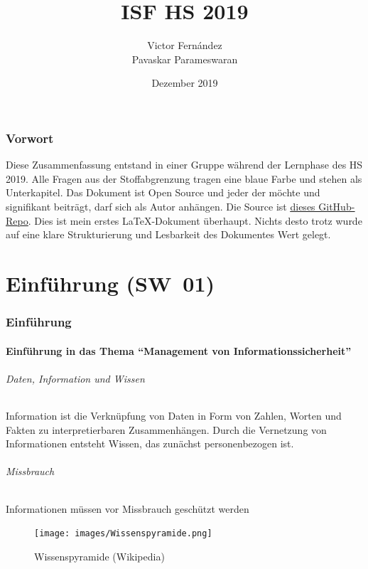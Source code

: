 \documentclass[10pt,a4paper]{article}
\title{ISF HS 2019}
\author{Victor Fernández\\Pavaskar Parameswaran}
\date{Dezember 2019}
\begin{document}
\maketitle
\thispagestyle{empty}
\section*{Vorwort}Diese Zusammenfassung entstand in einer Gruppe während der Lernphase des HS 2019. Alle Fragen aus der Stoffabgrenzung tragen eine {\color{dunkelblau}blaue Farbe} und stehen als Unterkapitel. Das Dokument ist Open Source und jeder der möchte und signifikant beiträgt, darf sich als Autor anhängen. Die Source ist \underline{\href{https://github.com/vigi86/HSLU_Zusammenfassungen/tree/master/ISF_HS19}{dieses GitHub-Repo}}. Dies ist mein erstes \LaTeX{}-Dokument überhaupt. Nichts desto trotz wurde auf eine klare Strukturierung und Lesbarkeit des Dokumentes Wert gelegt.
\tableofcontents
\thispagestyle{empty}
\pagebreak

\part{Einführung (SW~01)}
\section{Einführung}
\subsection*{Einführung in das Thema "`Management von Informationssicherheit"'}
\paragraph*{Daten, Information und Wissen}
Information ist die Verknüpfung von Daten in Form von Zahlen, Worten und Fakten zu interpretierbaren Zusammenhängen.
Durch die Vernetzung von Informationen entsteht Wissen, das zunächst personenbezogen ist.
\paragraph*{Missbrauch}Informationen müssen vor Missbrauch geschützt werden
\begin{figure}[ht]
    \begin{center}
    \texttt{[image: images/Wissenspyramide.png]}
    \caption{Wissenspyramide (Wikipedia)}
    \label{Wissenspyramide}
    \end{center}
\end{figure}
\end{document}
